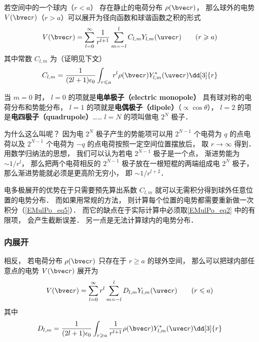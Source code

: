 

若空间中的一个球内（$r < a$） 存在静止的电荷分布 $\rho(\bvec r)$， 那么球外的电势 $V(\bvec r)$（$r > a$）可以展开为径向函数和球谐函数之积的形式
\begin{equation}\label{EMulPo_eq2}
V(\bvec r) = \sum_{l = 0}^\infty \frac{1}{r^{l+1}}\sum_{m = -l}^l C_{l,m} Y_{l,m}(\uvec r) \qquad (r \geqslant a)
\end{equation}
其中常数 $C_{l,m}$ 为（证明见下文）
\begin{equation}
C_{l,m} = \frac{1}{(2l+1)\epsilon_0} \int_{r\leqslant a} r^l \rho(\bvec r) Y_{l,m}^*(\uvec r) \dd[3]{r}
\end{equation}

当 $m = 0$ 时， $l = 0$ 的项就是\textbf{电单极子（electric monopole）} 具有球对称的电荷分布和势能分布， $l = 1$ 的项就是\textbf{电偶极子（dipole）}（$\propto\cos \theta$）， $l = 2$ 的项是\textbf{电四极子（quadrupole）}……  $l = N$ 的项叫做电 $2^N$ 极子．

为什么这么叫呢？ 因为电 $2^N$ 极子产生的势能项可以用 $2^{N-1}$ 个电荷为 $q$ 的点电荷以及 $2^{N-1}$ 个电荷为 $-q$ 的点电荷按照一定空间位置摆放后， 取 $r \to \infty$ 得到． 用数学归纳法的思想， 我们可以认为若电 $2^{N-1}$ 极子是一个点， 渐进势能为 $\sim 1/r^l$， 那么把两个电荷相反的 $2^{N-1}$ 极子放在一根短棍的两端组成电 $2^N$ 极子， 那么渐进势能就必须是更高阶无穷小， 即 $\sim 1/r^{l+2}$．

电多极展开的优势在于只需要预先算出系数 $C_{l,m}$ 就可以无需积分得到球外任意位置的电势分布． 而如果用常规的方法， 则计算每个位置的电势都需要重新做一次积分（\autoref{EMulPo_eq5}）． 而它的缺点在于实际计算中必须取\autoref{EMulPo_eq2} 中的有限项， 会产生截断误差． 另一点是无法计算球内的电势分布．

\subsubsection{内展开}
相反， 若电荷分布 $\rho(\bvec r)$ 只存在于 $r \geqslant a$ 的球外空间， 那么可以把球内部任意点的电势 $V(\bvec r)$ 展开为
\begin{equation}\label{EMulPo_eq4}
V(\bvec r) = \sum_{l = 0}^\infty r^l \sum_{m = -l}^l D_{l,m} Y_{l,m}(\uvec r) \qquad (r \leqslant a)
\end{equation}
其中
\begin{equation}\label{EMulPo_eq3}
D_{l,m} = \frac{1}{(2l+1)\epsilon_0} \int_{r\geqslant a} \frac{1}{r^{l+1}} \rho(\bvec r) Y_{l,m}^*(\uvec r) \dd[3]{r}
\end{equation}

